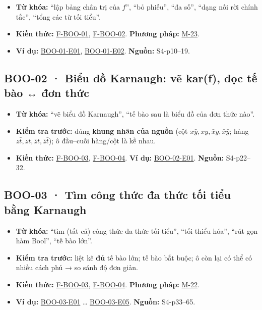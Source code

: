 \documentclass[
  10pt,
  twoside,openany]{book}
\providecommand{\tightlist}{%
  \setlength{\itemsep}{0pt}\setlength{\parskip}{0pt}}
\begin{document}
\begin{itemize}
\tightlist
\item
  \textbf{Từ khóa:} ``lập bảng chân trị của \(f\)'', ``bỏ phiếu'', ``đa
  số'', ``dạng nối rời chính tắc'', ``tổng các từ tối tiểu''.
\item
  \textbf{Kiến thức:} \protect\hyperlink{F-BOO-01}{F-BOO-01},
  \protect\hyperlink{F-BOO-02}{F-BOO-02}. \textbf{Phương pháp:}
  \protect\hyperlink{M-23}{M-23}.
\item
  \textbf{Ví dụ:} \protect\hyperlink{BOO-01-E01}{BOO-01-E01},
  \protect\hyperlink{BOO-01-E02}{BOO-01-E02}. \textbf{Nguồn:}
  S4-p10--19.
\end{itemize}

\hypertarget{BOO-02}{%
\subsection{BOO-02 · Biểu đồ Karnaugh: vẽ kar(f), đọc tế bào ↔ đơn
thức}\label{BOO-02}}

\begin{itemize}
\tightlist
\item
  \textbf{Từ khóa:} ``vẽ biểu đồ Karnaugh'', ``tế bào sau là biểu đồ của
  đơn thức nào''.
\item
  \textbf{Kiểm tra trước:} đúng \textbf{khung nhãn của nguồn} (cột
  \(x\bar y, xy, \bar xy, \bar x\bar y\); hàng
  \(z\bar t, zt, \bar zt, \bar z\bar t\)); ô đầu--cuối hàng/cột là kề
  nhau.
\item
  \textbf{Kiến thức:} \protect\hyperlink{F-BOO-03}{F-BOO-03},
  \protect\hyperlink{F-BOO-04}{F-BOO-04}. \textbf{Ví dụ:}
  \protect\hyperlink{BOO-02-E01}{BOO-02-E01}. \textbf{Nguồn:}
  S4-p22--32.
\end{itemize}

\hypertarget{BOO-03}{%
\subsection{BOO-03 · Tìm công thức đa thức tối tiểu bằng
Karnaugh}\label{BOO-03}}

\begin{itemize}
\tightlist
\item
  \textbf{Từ khóa:} ``tìm (tất cả) công thức đa thức tối tiểu'', ``tối
  thiểu hóa'', ``rút gọn hàm Bool'', ``tế bào lớn''.
\item
  \textbf{Kiểm tra trước:} liệt kê \textbf{đủ} tế bào lớn; tế bào bắt
  buộc; ô còn lại có thể có nhiều cách phủ → so sánh độ đơn giản.
\item
  \textbf{Kiến thức:} \protect\hyperlink{F-BOO-03}{F-BOO-03},
  \protect\hyperlink{F-BOO-04}{F-BOO-04}. \textbf{Phương pháp:}
  \protect\hyperlink{M-22}{M-22}.
\item
  \textbf{Ví dụ:} \protect\hyperlink{BOO-03-E01}{BOO-03-E01} \ldots{}
  \protect\hyperlink{BOO-03-E05}{BOO-03-E05}. \textbf{Nguồn:}
  S4-p33--65.
\end{itemize}
\end{document}
